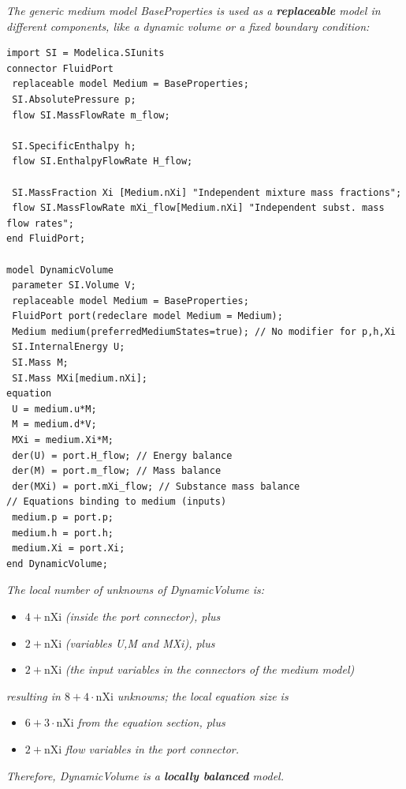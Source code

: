 \documentclass[10pt,a4paper]{report}
\def\Mcommentmid#1{\emph{#1}}
\begin{document}
\Mcommentmid{The generic medium model \emph{BaseProperties} is used as a
\textbf{replaceable} model in different components, like a dynamic
volume or a fixed boundary condition:}
\begin{lstlisting}[language=modelica]
import SI = Modelica.SIunits
connector FluidPort
 replaceable model Medium = BaseProperties;
 SI.AbsolutePressure p;
 flow SI.MassFlowRate m_flow;

 SI.SpecificEnthalpy h;
 flow SI.EnthalpyFlowRate H_flow;

 SI.MassFraction Xi [Medium.nXi] "Independent mixture mass fractions";
 flow SI.MassFlowRate mXi_flow[Medium.nXi] "Independent subst. mass flow rates";
end FluidPort;

model DynamicVolume
 parameter SI.Volume V;
 replaceable model Medium = BaseProperties;
 FluidPort port(redeclare model Medium = Medium);
 Medium medium(preferredMediumStates=true); // No modifier for p,h,Xi
 SI.InternalEnergy U;
 SI.Mass M;
 SI.Mass MXi[medium.nXi];
equation
 U = medium.u*M;
 M = medium.d*V;
 MXi = medium.Xi*M;
 der(U) = port.H_flow; // Energy balance
 der(M) = port.m_flow; // Mass balance
 der(MXi) = port.mXi_flow; // Substance mass balance
// Equations binding to medium (inputs)
 medium.p = port.p;
 medium.h = port.h;
 medium.Xi = port.Xi;
end DynamicVolume;
\end{lstlisting}
\Mcommentmid{The local number of unknowns of \emph{DynamicVolume} is:}

\begin{itemize}
\item
  $4+\textrm{nXi}$ \Mcommentmid{(inside the \emph{port} connector), plus}
\item
  $2+\textrm{nXi}$ \Mcommentmid{(variables \emph{U},\emph{M} and \emph{MXi}),
  plus}
\item
  $2+\textrm{nXi}$ \Mcommentmid{(the input variables in the connectors of the
  \emph{medium} model)}
\end{itemize}

\Mcommentmid{resulting in $8+4\cdot\textrm{nXi}$ unknowns; the local equation size is }

\begin{itemize}
\item
  $6+3\cdot\textrm{nXi}$ \Mcommentmid{from the equation section, plus}
\item
  $2+\textrm{nXi}$ \Mcommentmid{flow variables in the \emph{port} connector. }
\end{itemize}

\Mcommentmid{Therefore, \emph{DynamicVolume} is a \textbf{locally balanced}
model.}
\end{document}

